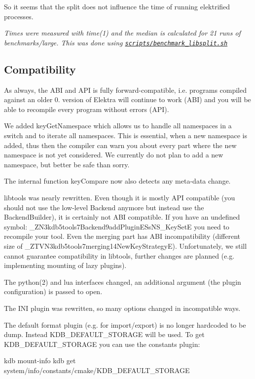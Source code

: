 So it seems that the split does not influence the time of running elektrified processes.

{\itshape Times were measured with time(1) and the median is calculated for 21 runs of benchmarks/large. This was done using \href{https://github.com/ElektraInitiative/libelektra/blob/master/scripts/benchmark_libsplit.sh}{\tt scripts/benchmark\+\_\+libsplit.\+sh}}

\subsection*{Compatibility}

As always, the A\+B\+I and A\+P\+I is fully forward-\/compatible, i.\+e. programs compiled against an older 0. version of Elektra will continue to work (A\+B\+I) and you will be able to recompile every program without errors (A\+P\+I).

We added {\ttfamily key\+Get\+Namespace} which allows us to handle all namespaces in a switch and to iterate all namespaces. This is essential, when a new namespace is added, thus then the compiler can warn you about every part where the new namespace is not yet considered. We currently do not plan to add a new namespace, but better be safe than sorry.

The internal function {\ttfamily key\+Compare} now also detects any meta-\/data change.

libtools was nearly rewritten. Even though it is mostly A\+P\+I compatible (you should not use the low-\/level {\ttfamily Backend} anymore but instead use the {\ttfamily Backend\+Builder}), it is certainly not A\+B\+I compatible. If you have an undefined symbol\+: {\ttfamily \+\_\+\+Z\+N3kdb5tools7\+Backend9add\+Plugin\+E\+Ss\+N\+S\+\_\+Key\+Set\+E} you need to recompile your tool. Even the merging part has A\+B\+I incompatibility (different size of {\ttfamily \+\_\+\+Z\+T\+V\+N3kdb5tools7merging14\+New\+Key\+Strategy\+E}). Unfortunately, we still cannot guarantee compatibility in {\ttfamily libtools}, further changes are planned (e.\+g. implementing mounting of lazy plugins).

The python(2) and lua interfaces changed, an additional argument (the plugin configuration) is passed to {\ttfamily open}.

The I\+N\+I plugin was rewritten, so many options changed in incompatible ways.

The default format plugin (e.\+g. for import/export) is no longer hardcoded to be {\ttfamily dump}. Instead K\+D\+B\+\_\+\+D\+E\+F\+A\+U\+L\+T\+\_\+\+S\+T\+O\+R\+A\+G\+E will be used. To get K\+D\+B\+\_\+\+D\+E\+F\+A\+U\+L\+T\+\_\+\+S\+T\+O\+R\+A\+G\+E you can use the constants plugin\+: \begin{DoxyVerb}    kdb mount-info
    kdb get system/info/constants/cmake/KDB_DEFAULT_STORAGE
\end{DoxyVerb}



